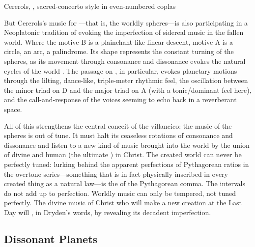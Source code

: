 {Cererols, , sacred-concerto style in even-numbered
coplas}

But Cererols's music for ---that is, the worldly
spheres---is also participating in a Neoplatonic tradition of evoking the
imperfection of sidereal music in the fallen world.
Where the  motive B is a plainchant-like linear descent, motive A
is a circle, an arc, a palindrome.
Its shape represents the constant turning of the spheres, as its movement
through consonance and dissonance evokes the natural cycles of the world
.
The passage on , in particular, evokes
planetary motions through the lilting, dance-like, triple-meter rhythmic feel,
the oscillation between the minor triad on D and the major triad on A (with a
tonic/dominant feel here), and the call-and-response of the voices seeming to
echo back in a reverberant space.

All of this strengthens the central conceit of the villancico: the music of the
spheres is out of tune.
It must halt its ceaseless rotations of consonance and dissonance and listen to
a new kind of music brought into the world by the union of divine and human (the
ultimate ) in Christ.
The created world can never be perfectly tuned: lurking behind the apparent
perfections of Pythagorean ratios in the overtone series---something that is in
fact physically inscribed in every created thing as a natural law---is the
 of the Pythagorean comma.
The intervals do not add up to perfection.
Worldly music can only be tempered, not tuned perfectly.
The divine music of Christ who will make a new creation at the Last Day will
, in Dryden's words, by revealing its decadent
imperfection.

\subsection{Dissonant Planets}

